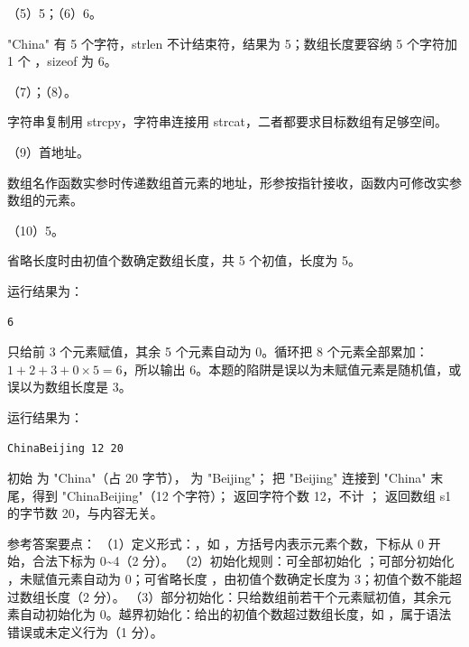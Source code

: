 \documentclass[a4paper,11pt]{article}
\begin{document}
\q （5）5；（6）6。\begin{analysis}"China" 有 5 个字符，strlen 不计结束符，结果为 5；数组长度要容纳 5 个字符加 1 个 ，sizeof 为 6。\end{analysis}

\q （7）；（8）。\begin{analysis}字符串复制用 strcpy，字符串连接用 strcat，二者都要求目标数组有足够空间。\end{analysis}

\q （9）首地址。\begin{analysis}数组名作函数实参时传递数组首元素的地址，形参按指针接收，函数内可修改实参数组的元素。\end{analysis}

\q （10）5。\begin{analysis}省略长度时由初值个数确定数组长度，共 5 个初值，长度为 5。\end{analysis}


\q 运行结果为：
\begin{lstlisting}
6
\end{lstlisting}
\begin{analysis} 只给前 3 个元素赋值，其余 5 个元素自动为 0。循环把 8 个元素全部累加：$1+2+3+0\times5=6$，所以输出 6。本题的陷阱是误以为未赋值元素是随机值，或误以为数组长度是 3。\end{analysis}

\q 运行结果为：
\begin{lstlisting}
ChinaBeijing 12 20
\end{lstlisting}
\begin{analysis}初始  为 "China"（占 20 字节）， 为 "Beijing"； 把 "Beijing" 连接到 "China" 末尾，得到 "ChinaBeijing"（12 个字符）； 返回字符个数 12，不计 ； 返回数组 s1 的字节数 20，与内容无关。\end{analysis}


\q 参考答案要点：
（1）定义形式：，如 ，方括号内表示元素个数，下标从 0 开始，合法下标为 0\textasciitilde 4（2 分）。
（2）初始化规则：可全部初始化 ；可部分初始化 ，未赋值元素自动为 0；可省略长度 ，由初值个数确定长度为 3；初值个数不能超过数组长度（2 分）。
（3）部分初始化：只给数组前若干个元素赋初值，其余元素自动初始化为 0。越界初始化：给出的初值个数超过数组长度，如 ，属于语法错误或未定义行为（1 分）。
\end{document}
